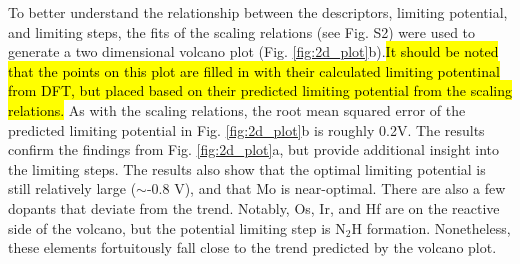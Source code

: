To better understand the relationship between the descriptors, limiting potential, and limiting steps, the fits of the scaling relations (see Fig. S2) were used to generate a two dimensional volcano plot (Fig. \ref{fig:2d_plot}b).\hl{It should be noted that the points on this plot are filled in with their calculated limiting potentinal from DFT, but placed based on their predicted limiting potential from the scaling relations.} As with the scaling relations, the root mean squared error of the predicted limiting potential in Fig. \ref{fig:2d_plot}b is roughly 0.2V. The results confirm the findings from Fig. \ref{fig:2d_plot}a, but provide additional insight into the limiting steps. 
The results also show that the optimal limiting potential is still relatively large ($\sim$-0.8 V), and that Mo is near-optimal.
There are also a few dopants that deviate from the trend. 
Notably, Os, Ir, and Hf are on the reactive side of the volcano, but the potential limiting step is N$_2$H formation\cite{Comer_2018, Hoskuldsson_2017}. Nonetheless, these elements fortuitously fall close to the trend predicted by the volcano plot. 

